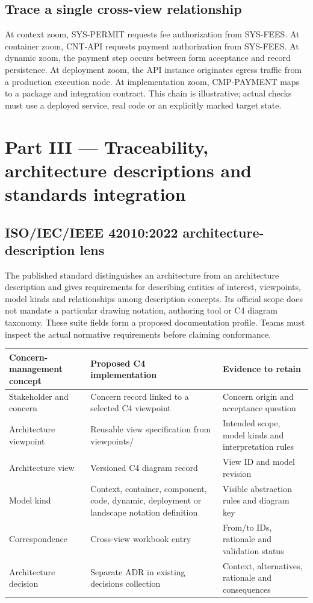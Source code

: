\documentclass[10pt,letterpaper]{article}
\begin{document}
\subsection{Trace a single cross-view relationship}
At context zoom, SYS-PERMIT requests fee authorization from SYS-FEES. At container zoom, CNT-API requests payment authorization from SYS-FEES. At dynamic zoom, the payment step occurs between form acceptance and record persistence. At deployment zoom, the API instance originates egress traffic from a production execution node. At implementation zoom, CMP-PAYMENT maps to a package and integration contract. This chain is illustrative; actual checks must use a deployed service, real code or an explicitly marked target state.

\section{Part III — Traceability, architecture descriptions and standards integration}
\subsection{ISO/IEC/IEEE 42010:2022 architecture-description lens}
The published standard distinguishes an architecture from an architecture description and gives requirements for describing entities of interest, viewpoints, model kinds and relationships among description concepts. Its official scope does not mandate a particular drawing notation, authoring tool or C4 diagram taxonomy. These suite fields form a proposed documentation profile. Teams must inspect the actual normative requirements before claiming conformance.

\begin{tabularx}{\linewidth}{@{}YYY@{}}\toprule
\textbf{Concern-management concept} & \textbf{Proposed C4 implementation} & \textbf{Evidence to retain} \\ \midrule
Stakeholder and concern & Concern record linked to a selected C4 viewpoint & Concern origin and acceptance question \\
Architecture viewpoint & Reusable view specification from viewpoints/ & Intended scope, model kinds and interpretation rules \\
Architecture view & Versioned C4 diagram record & View ID and model revision \\
Model kind & Context, container, component, code, dynamic, deployment or landscape notation definition & Visible abstraction rules and diagram key \\
Correspondence & Cross-view workbook entry & From/to IDs, rationale and validation status \\
Architecture decision & Separate ADR in existing decisions collection & Context, alternatives, rationale and consequences \\
\bottomrule\end{tabularx}
\end{document}
